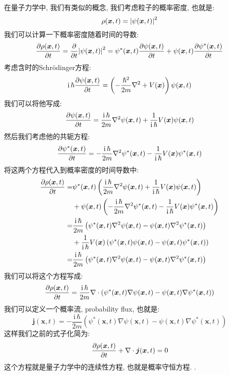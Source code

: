 在量子力学中, 我们有类似的概念, 我们考虑粒子的概率密度, 也就是:
\begin{equation}
  \rho(\bm{x}, t) = \abs{\psi(\bm{x}, t)}^2
\end{equation}
我们可以计算一下概率密度随着时间的导数:
\begin{equation}
  \pdv{\rho(\bm{x}, t)}{t} = \pdv{}{t} \abs{\psi(\bm{x}, t)}^2 = \psi^*(\bm{x}, t) \pdv{\psi(\bm{x}, t)}{t} + \psi(\bm{x}, t) \pdv{\psi^*(\bm{x}, t)}{t}
\end{equation}
考虑含时的Schrödinger方程:
\begin{equation}
  \mathrm{i}\, \hbar \pdv{\psi(\bm{x}, t)}{t} = \left( -\frac{\hbar^2}{2m} \nabla^2 + V(\bm{x}) \right) \psi(\bm{x}, t)
\end{equation}
我们可以将他写成:
\begin{equation}
  \pdv{\psi(\bm{x}, t)}{t} = \frac{\mathrm{i}\, \hbar}{2m} \nabla^2 \psi(\bm{x}, t) + \frac{1}{\mathrm{i}\, \hbar} V(\bm{x}) \psi(\bm{x}, t)
\end{equation}
然后我们考虑他的共轭方程:
\begin{equation}
  \pdv{\psi^*(\bm{x}, t)}{t} = -\frac{\mathrm{i}\, \hbar}{2m} \nabla^2 \psi^*(\bm{x}, t) - \frac{1}{\mathrm{i}\, \hbar} V(\bm{x}) \psi^*(\bm{x}, t)
\end{equation}
将这两个方程代入到概率密度的时间导数中:
\begin{align}
  \pdv{\rho(\bm{x}, t)}{t} =& \psi^*(\bm{x}, t) \left( \frac{\mathrm{i}\, \hbar}{2m} \nabla^2 \psi(\bm{x}, t) + \frac{1}{\mathrm{i}\, \hbar} V(\bm{x}) \psi(\bm{x}, t) \right) \\
  &+ \psi(\bm{x}, t) \left( -\frac{\mathrm{i}\, \hbar}{2m} \nabla^2 \psi^*(\bm{x}, t) - \frac{1}{\mathrm{i}\, \hbar} V(\bm{x}) \psi^*(\bm{x}, t) \right) \\
  =& \frac{\mathrm{i}\, \hbar}{2m} \left( \psi^*(\bm{x}, t) \nabla^2 \psi(\bm{x}, t) - \psi(\bm{x}, t) \nabla^2 \psi^*(\bm{x}, t) \right) \\
  &+ \frac{1}{\mathrm{i}\, \hbar} V(\bm{x}) \left( \psi^*(\bm{x}, t) \psi(\bm{x}, t) - \psi(\bm{x}, t) \psi^*(\bm{x}, t) \right) \\
  =& \frac{\mathrm{i}\, \hbar}{2m} \left( \psi^*(\bm{x}, t) \nabla^2 \psi(\bm{x}, t) - \psi(\bm{x}, t) \nabla^2 \psi^*(\bm{x}, t) \right)
\end{align}
我们可以将这个方程写成:
\begin{equation}
  \pdv{\rho(\bm{x}, t)}{t} = \frac{\mathrm{i}\, \hbar}{2m} \nabla \cdot \left( \psi^*(\bm{x}, t) \nabla \psi(\bm{x}, t) - \psi(\bm{x}, t) \nabla \psi^*(\bm{x}, t) \right)
\end{equation}
我们可以定义一个概率流, probability flux, 也就是:
\begin{equation}
  \bm{j}(\bm{x}, t) = -\frac{\mathrm{i}\, \hbar}{2m} \left( \psi^*(\bm{x}, t) \nabla \psi(\bm{x}, t) - \psi(\bm{x}, t) \nabla \psi^*(\bm{x}, t) \right)
\end{equation}
这样我们之前的式子化简为:
\begin{equation}
  \pdv{\rho(\bm{x}, t)}{t} + \nabla \cdot \bm{j}(\bm{x}, t) = 0
\end{equation}
这个方程就是量子力学中的连续性方程, 也就是概率守恒方程.
.


